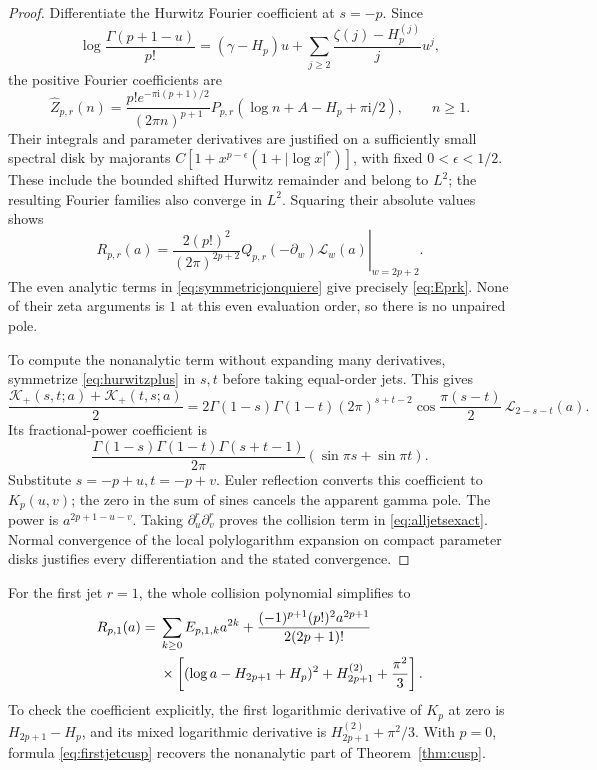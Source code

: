 \documentclass[11pt]{article}
\numberwithin{equation}{section}
\theoremstyle{definition}\newtheorem{definition}[theorem]{Definition}
\theoremstyle{remark}\newtheorem{remark}[theorem]{Remark}
\newcommand{\iu}{\mathrm i}
\newcommand{\calK}{\mathcal K}
\begin{document}
\begin{proof}
Differentiate the Hurwitz Fourier coefficient at $s=-p$. Since
\[
 \log\frac{\Gamma(p+1-u)}{p!}
  =(\gamma-H_p)u+
                \sum_{j\ge2}\frac{\zeta(j)-H_p^{(j)}}j u^j,
\]
the positive Fourier coefficients are
\begin{equation}\label{eq:jetFourier}
 \widehat Z_{p,r}(n)=
 \frac{p!e^{-\pi\iu(p+1)/2}}{(2\pi n)^{p+1}}
      P_{p,r}(\log n+A-H_p+\pi\iu/2),\qquad n\ge1.
\end{equation}
Their integrals and parameter derivatives are justified on a sufficiently
small spectral disk by majorants
$C[1+x^{p-\epsilon}(1+|\log x|^r)]$, with fixed $0<\epsilon<1/2$.
These include the bounded shifted Hurwitz remainder and belong to $L^2$;
the resulting Fourier families also converge in $L^2$.
Squaring their absolute values shows
\begin{equation}\label{eq:jetoperator}
 R_{p,r}(a)=\left.\frac{2(p!)^2}{(2\pi)^{2p+2}}
           Q_{p,r}(-\partial_w)\mathcal L_w(a)\right|_{w=2p+2}.
\end{equation}
The even analytic terms in \eqref{eq:symmetricjonquiere} give precisely
\eqref{eq:Eprk}. None of their zeta arguments is $1$ at this even
evaluation order, so there is no unpaired pole.

To compute the nonanalytic term without expanding many derivatives,
symmetrize \eqref{eq:hurwitzplus} in $s,t$ before taking equal-order
jets. This gives
\[
 \frac{\calK_+(s,t;a)+\calK_+(t,s;a)}2
 =2\Gamma(1-s)\Gamma(1-t)(2\pi)^{s+t-2}
       \cos\frac{\pi(s-t)}2\,\mathcal L_{2-s-t}(a).
\]
Its fractional-power coefficient is
\[
 \frac{\Gamma(1-s)\Gamma(1-t)\Gamma(s+t-1)}{2\pi}
                      (\sin\pi s+\sin\pi t).
\]
Substitute $s=-p+u,t=-p+v$. Euler reflection converts this coefficient
to $K_p(u,v)$; the zero in the sum of sines cancels the apparent
gamma pole. The power is $a^{2p+1-u-v}$.
Taking $\partial_u^r\partial_v^r$ proves the collision term in
\eqref{eq:alljetsexact}. Normal convergence of the local polylogarithm
expansion on compact parameter disks justifies every differentiation and
the stated convergence.
\end{proof}

For the first jet $r=1$, the whole collision polynomial simplifies to
\begin{align}\label{eq:firstjetcusp}
 R_{p,1}(a)={}&\sum_{k\ge0}E_{p,1,k}a^{2k}
 +\frac{(-1)^{p+1}(p!)^2a^{2p+1}}{2(2p+1)!}\notag\\
 &\times\left[(\log a-H_{2p+1}+H_p)^2
                       +H_{2p+1}^{(2)}+\frac{\pi^2}{3}\right].
\end{align}
To check the coefficient explicitly, the first logarithmic derivative of
$K_p$ at zero is $H_{2p+1}-H_p$, and its mixed logarithmic derivative is
$H_{2p+1}^{(2)}+\pi^2/3$. With $p=0$, formula
\eqref{eq:firstjetcusp} recovers the nonanalytic part of
Theorem~\ref{thm:cusp}.
\end{document}
